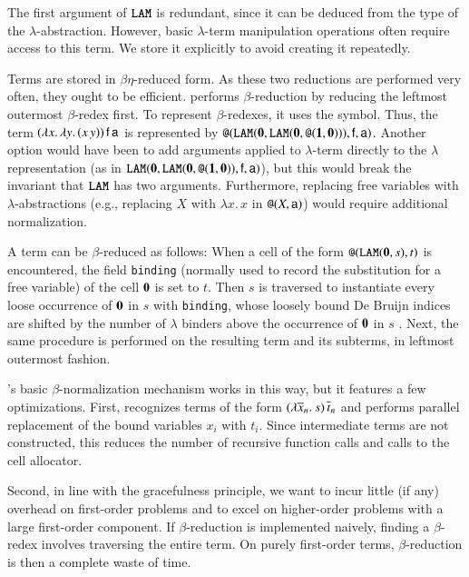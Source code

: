 The first argument of $\texttt{LAM}$ is
redundant, since it can be deduced from the type of the $\lambda$-abstraction.
However, basic $\lambda$-term manipulation operations often require access to
this term. We store it explicitly to avoid creating it repeatedly.

Terms are stored in $\beta\eta$-reduced form. As these two reductions are
performed very often, they ought to be efficient. \ehohii{}
performs $\beta$-reduction by reducing the leftmost outermost $\beta$-redex
first. To represent $\beta$-redexes, it uses the \internalat{} symbol. Thus,
the term $(\lambda
x.\, \lambda y.\,  (x \, y)) \, \mathsf{f} \, \mathsf{a}$ is represented by
$\texttt{@}(\texttt{LAM}(\mathbf{0}, \texttt{LAM}(\mathbf{0}, \texttt{@}(\mathbf{1}, \mathbf{0}))),
\mathsf{f}, \mathsf{a})$. Another option would have been to add arguments applied to
$\lambda$-term directly to the $\lambda$ representation (as in
$\texttt{LAM}(\mathbf{0}, \texttt{LAM}(\mathbf{0}, \allowbreak \texttt{@}(\mathbf{1}, \mathbf{0})),
\mathsf{f}, \mathsf{a})$), but this would break the invariant
that $\texttt{LAM}$ has two arguments. Furthermore, replacing free
variables with $\lambda$-abstractions (e.g., replacing $X$ with $\lambda
x. \, x$ in $\texttt{@}(X, \mathsf{a})$) would require additional normalization.

A term can be $\beta$-reduced as follows: When a cell of the
form $ \texttt{@}(\texttt{LAM}(\mathbf{0}, s),t)$ is encountered, the field
\texttt{binding} (normally used to record the substitution for a free variable) of the
cell $\mathbf{0}$ is set to $t$. Then $s$ is traversed to instantiate every
loose occurrence of $\mathbf{0}$ in $s$ with \texttt{binding}, whose loosely
bound De Bruijn indices are shifted by the number of $\lambda$ binders above
the occurrence of $\mathbf{0}$ in $s$ \cite{fk-01-deBruijn}. Next, the same
procedure is performed on the resulting term and its subterms, in
leftmost outermost fashion.

\ehohii{}'s basic $\beta$-normalization mechanism works in this way, but it
features a few optimizations.
First, \ehohii{} recognizes terms of the form $(\lambda \overline{x}_n.\> s) \,\overline{t}_n$ 
and performs parallel replacement of the bound variables $x_i$ with
$t_i$. Since intermediate terms are not constructed, this reduces the number of
recursive function calls and calls to the cell allocator.

Second, in line with the gracefulness principle, we want \ehohii{} to incur
little (if any) overhead on first-order problems and to
excel on higher-order problems with a large first-order component. If
$\beta$-reduction is implemented naively, finding a $\beta$-redex involves
traversing the entire term. On purely first-order terms, $\beta$-reduction
is then a complete waste of time.

